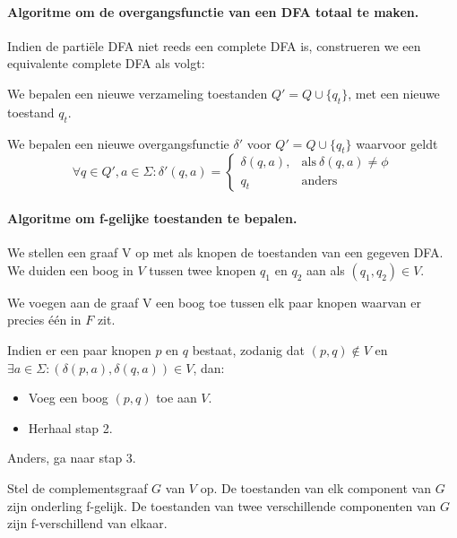 \paragraph{Algoritme om de overgangsfunctie van een DFA totaal te maken.}
  Indien de parti\"ele DFA niet reeds een complete DFA is, construeren we een equivalente complete DFA als volgt:
  \begin{enumalgo}
  \item We bepalen een nieuwe verzameling toestanden $Q' = Q \cup \{q_t\}$, met een nieuwe toestand $q_t$.
  \item We bepalen een nieuwe overgangsfunctie $\delta'$ voor $Q' = Q \cup \{q_t\}$ waarvoor geldt
  \begin{equation*}
  \forall q \in Q', a \in \Sigma: \delta'(q, a) = \begin{cases}
    \delta(q, a), & \text{als}\ \delta(q, a) \neq \phi\\
    q_t & \text{anders}
  \end{cases}
  \end{equation*}
  \end{enumalgo}

\paragraph{Algoritme om f-gelijke toestanden te bepalen.}
  We stellen een graaf V op met als knopen de toestanden van een gegeven DFA. We duiden een boog in $V$ tussen twee knopen $q_1$ en $q_2$ aan als $(q_1,q_2) \in V$.
  \begin{enumalgo}
  \item We voegen aan de graaf V een boog toe tussen elk paar knopen waarvan er precies \'e\'en in $F$ zit.
  \item Indien er een paar knopen $p$ en $q$ bestaat, zodanig dat $(p,q) \notin V$ en $\exists a \in \Sigma: (\delta(p, a),\delta(q, a)) \in V$, dan:
  \begin{itemize}
  \item Voeg een boog $(p,q)$ toe aan $V$.
  \item Herhaal stap 2.
  \end{itemize}
  Anders, ga naar stap 3.
  \item Stel de complementsgraaf $G$ van $V$ op. De toestanden van elk component van $G$ zijn onderling f-gelijk. De toestanden van twee verschillende componenten van $G$ zijn f-verschillend van elkaar.
  \end{enumalgo}

